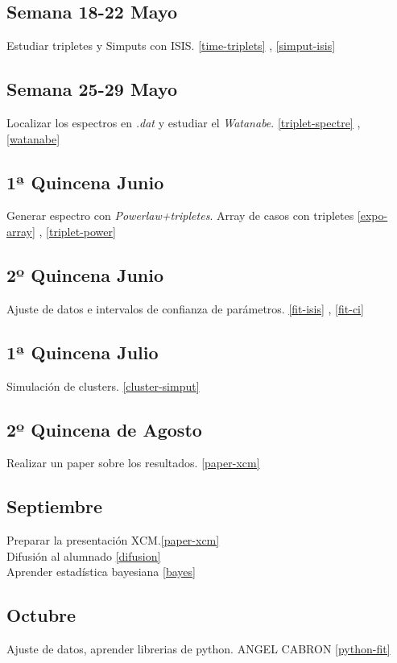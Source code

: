 \documentclass[letterpaper,12pt]{article}
\begin{document}
\subsection*{Semana 18-22 Mayo}
Estudiar tripletes y Simputs con ISIS. \ref{time-triplets} , \ref{simput-isis}
\subsection*{Semana 25-29 Mayo}
Localizar los espectros en \textit{.dat} y estudiar el \textit{Watanabe}. \ref{triplet-spectre} , \ref{watanabe}
\subsection*{1ª Quincena Junio}
Generar espectro con \textit{Powerlaw+tripletes}. Array de casos con tripletes \ref{expo-array} , \ref{triplet-power}
\subsection*{2º Quincena Junio}
Ajuste de datos e intervalos de confianza de par\'ametros. \ref{fit-isis} , \ref{fit-ci}
\subsection*{1ª Quincena Julio}
Simulaci\'on de clusters. \ref{cluster-simput}
\subsection*{2º Quincena de Agosto}
Realizar un paper sobre los resultados. \ref{paper-xcm}
\subsection*{Septiembre}
Preparar la presentaci\'on XCM.\ref{paper-xcm}
\\Difusi\'on al alumnado \ref{difusion}
\\Aprender estad\'istica bayesiana \ref{bayes}
\subsection*{Octubre}
Ajuste de datos, aprender librerias de python. ANGEL CABRON \ref{python-fit}
%
\end{document}
